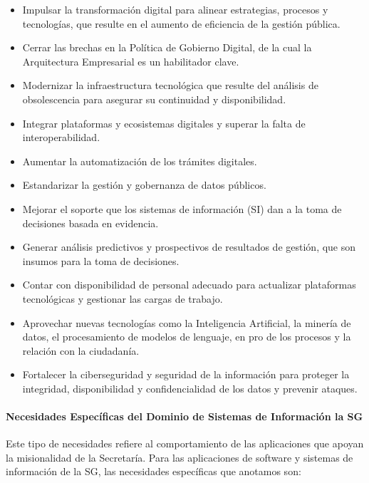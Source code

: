 \documentclass[
	a4paper, %
	12pt, %
]{include/CSSullivanBusinessReport}
\def\tightlist{}
\begin{document}
\begin{itemize}
\tightlist
\item
  Impulsar la transformación digital para alinear estrategias, procesos
  y tecnologías, que resulte en el aumento de eficiencia de la gestión
  pública.
\item
  Cerrar las brechas en la Política de Gobierno Digital, de la cual la
  Arquitectura Empresarial es un habilitador clave.
\item
  Modernizar la infraestructura tecnológica que resulte del análisis de
  obsolescencia para asegurar su continuidad y disponibilidad.
\item
  Integrar plataformas y ecosistemas digitales y superar la falta de
  interoperabilidad.
\item
  Aumentar la automatización de los trámites digitales.
\item
  Estandarizar la gestión y gobernanza de datos públicos.
\item
  Mejorar el soporte que los sistemas de información (SI) dan a la toma
  de decisiones basada en evidencia.
\item
  Generar análisis predictivos y prospectivos de resultados de gestión,
  que son insumos para la toma de decisiones.
\item
  Contar con disponibilidad de personal adecuado para actualizar
  plataformas tecnológicas y gestionar las cargas de trabajo.
\item
  Aprovechar nuevas tecnologías como la Inteligencia Artificial, la
  minería de datos, el procesamiento de modelos de lenguaje, en pro de
  los procesos y la relación con la ciudadanía.
\item
  Fortalecer la ciberseguridad y seguridad de la información para
  proteger la integridad, disponibilidad y confidencialidad de los datos
  y prevenir ataques.
\end{itemize}

\paragraph{Necesidades Específicas del Dominio de Sistemas de
Información la
SG}\label{sec:necesidades-especuxedficas-del-dominio-de-sistemas-de-informaciuxf3n-la-sg}

Este tipo de necesidades refiere al comportamiento de las aplicaciones
que apoyan la misionalidad de la Secretaría. Para las aplicaciones de
software y sistemas de información de la SG, las necesidades específicas
que anotamos son:
\end{document}

